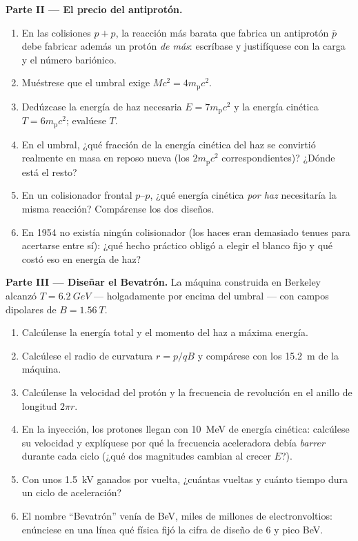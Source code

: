 \begin{problem}
\medskip\noindent\textbf{Parte II --- El precio del antiprotón.}
\begin{enumerate}[resume]
  \item En las colisiones $p + p$, la reacción más barata que fabrica un
        antiprotón $\bar p$ debe fabricar además un protón \emph{de más}:
        escríbase y justifíquese con la carga y el número bariónico.
  \item Muéstrese que el umbral exige $Mc^2 = 4m_{\text{p}}c^2$.
  \item Dedúzcase la energía de haz necesaria $E = 7m_{\text{p}}c^2$ y la
        energía cinética $T = 6m_{\text{p}}c^2$; evalúese $T$.
  \item En el umbral, ¿qué fracción de la energía cinética del haz se
        convirtió realmente en masa en reposo nueva (los
        $2m_{\text{p}}c^2$ correspondientes)? ¿Dónde está el resto?
  \item En un colisionador frontal $p$--$p$, ¿qué energía cinética
        \emph{por haz} necesitaría la misma reacción? Compárense los dos
        diseños.
  \item En 1954 no existía ningún colisionador (los haces eran demasiado
        tenues para acertarse entre sí): ¿qué hecho práctico obligó a
        elegir el blanco fijo y qué costó eso en energía de haz?
\end{enumerate}

\medskip\noindent\textbf{Parte III --- Diseñar el Bevatrón.}
La máquina construida en Berkeley alcanzó $T = \qty{6.2}{GeV}$ ---
holgadamente por encima del umbral --- con campos dipolares de $B =
\qty{1.56}{T}$.
\begin{enumerate}[resume]
  \item Calcúlense la energía total y el momento del haz a máxima energía.
  \item Calcúlese el radio de curvatura $r = p/qB$ y compárese con los
        \qty{15.2}{m} de la máquina.
  \item Calcúlense la velocidad del protón y la frecuencia de revolución en
        el anillo de longitud $2\pi r$.
  \item En la inyección, los protones llegan con \qty{10}{MeV} de energía
        cinética: calcúlese su velocidad y explíquese por qué la frecuencia
        aceleradora debía \emph{barrer} durante cada ciclo (¿qué dos
        magnitudes cambian al crecer $E$?).
  \item Con unos \qty{1.5}{kV} ganados por vuelta, ¿cuántas vueltas y
        cuánto tiempo dura un ciclo de aceleración?
  \item El nombre ``Bevatrón'' venía de BeV, miles de millones de
        electronvoltios: enúnciese en una línea qué física fijó la cifra de
        diseño de $6$ y pico BeV.
\end{enumerate}


\end{problem}
